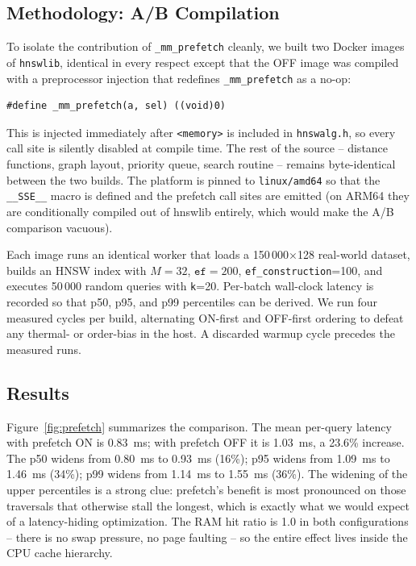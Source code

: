 \documentclass[conference]{IEEEtran}
\begin{document}
\subsection{Methodology: A/B Compilation}
To isolate the contribution of \texttt{\_mm\_prefetch} cleanly, we built
two Docker images of \texttt{hnswlib}, identical in every respect except
that the OFF image was compiled with a preprocessor injection that
redefines \texttt{\_mm\_prefetch} as a no-op:

\begin{verbatim}
#define _mm_prefetch(a, sel) ((void)0)
\end{verbatim}

\noindent
This is injected immediately after \texttt{<memory>} is included in
\texttt{hnswalg.h}, so every call site is silently disabled at compile
time. The rest of the source -- distance functions, graph layout,
priority queue, search routine -- remains byte-identical between the
two builds. The platform is pinned to \texttt{linux/amd64} so that the
\texttt{\_\_SSE\_\_} macro is defined and the prefetch call sites are
emitted (on ARM64 they are conditionally compiled out of hnswlib
entirely, which would make the A/B comparison vacuous).

Each image runs an identical worker that loads a 150\,000$\times$128
real-world dataset, builds an HNSW index with $M=32$, $\texttt{ef}=200$,
\texttt{ef\_construction}=100, and executes 50\,000 random queries with
\texttt{k}=20. Per-batch wall-clock latency is recorded so that p50,
p95, and p99 percentiles can be derived. We run four measured cycles per
build, alternating ON-first and OFF-first ordering to defeat any
thermal- or order-bias in the host. A discarded warmup cycle precedes
the measured runs.

\subsection{Results}
Figure~\ref{fig:prefetch} summarizes the comparison. The mean per-query
latency with prefetch ON is 0.83~ms; with prefetch OFF it is 1.03~ms,
a 23.6\% increase. The p50 widens from 0.80~ms to 0.93~ms (16\%); p95
widens from 1.09~ms to 1.46~ms (34\%); p99 widens from 1.14~ms to
1.55~ms (36\%). The widening of the upper percentiles is a strong
clue: prefetch's benefit is most pronounced on those traversals that
otherwise stall the longest, which is exactly what we would expect of
a latency-hiding optimization. The RAM hit ratio is 1.0 in both
configurations -- there is no swap pressure, no page faulting -- so
the entire effect lives inside the CPU cache hierarchy.
\end{document}

